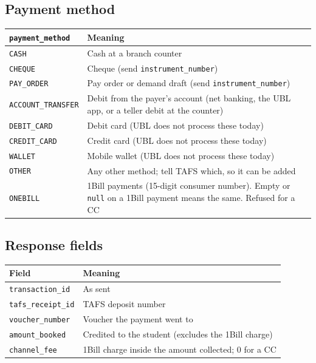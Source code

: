\documentclass[11pt]{article}
\begin{document}
\subsection{Payment method}\label{sec:method}
\begin{center}
\begin{tabularx}{\textwidth}{@{}l L@{}}
\toprule
\texttt{payment\_method} & \textbf{Meaning} \\
\midrule
\texttt{CASH} & Cash at a branch counter \\
\texttt{CHEQUE} & Cheque (send \texttt{instrument\_number}) \\
\texttt{PAY\_ORDER} & Pay order or demand draft (send \texttt{instrument\_number}) \\
\texttt{ACCOUNT\_TRANSFER} & Debit from the payer's account (net banking, the UBL app, or a teller debit at the counter) \\
\texttt{DEBIT\_CARD} & Debit card (UBL does not process these today) \\
\texttt{CREDIT\_CARD} & Credit card (UBL does not process these today) \\
\texttt{WALLET} & Mobile wallet (UBL does not process these today) \\
\texttt{OTHER} & Any other method; tell TAFS which, so it can be added \\
\texttt{ONEBILL} & 1Bill payments (15-digit consumer number). Empty or \texttt{null} on a 1Bill payment means the same. Refused for a CC \\
\bottomrule
\end{tabularx}
\end{center}

\subsection{Response fields}
\begin{center}
\begin{tabularx}{\textwidth}{@{}l L@{}}
\toprule
\textbf{Field} & \textbf{Meaning} \\
\midrule
\texttt{transaction\_id} & As sent \\
\texttt{tafs\_receipt\_id} & TAFS deposit number \\
\texttt{voucher\_number} & Voucher the payment went to \\
\texttt{amount\_booked} & Credited to the student (excludes the 1Bill charge) \\
\texttt{channel\_fee} & 1Bill charge inside the amount collected; 0 for a CC \\
\bottomrule
\end{tabularx}
\end{center}
\end{document}
